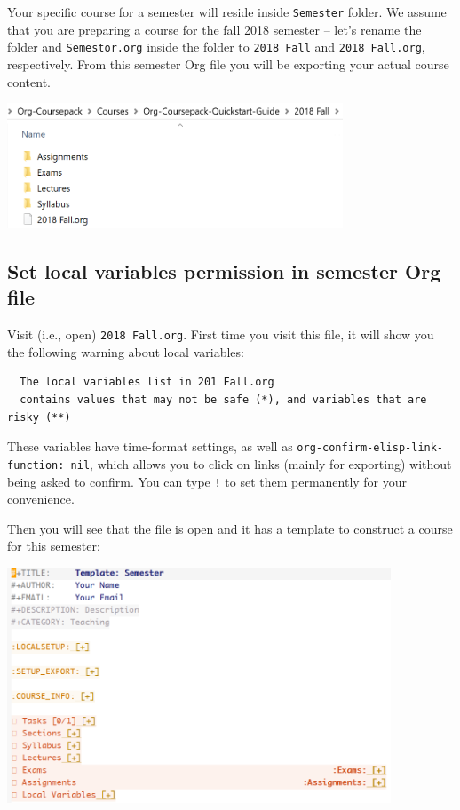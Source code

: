 \documentclass[10pt,article]{article}
\begin{document}
Your specific course for a semester will reside inside \texttt{Semester} folder. We
assume that you are preparing a course for the fall 2018 semester -- let's
rename the folder and \texttt{Semestor.org} inside the folder to \texttt{2018 Fall} and
\texttt{2018 Fall.org}, respectively. From this semester Org file you will be
exporting your actual course content.

\begin{center}
\includegraphics[width=10cm]{../../../Assets/Images/Org-Teaching/Quickstart_Semester-renamed.png}
\end{center}
\subsection{Set local variables permission in semester Org file}
\label{sec:orgc210200}
Visit (i.e., open) \texttt{2018 Fall.org}. First time you visit this file, it will 
show you the following warning about local variables:

\begin{verbatim}
  The local variables list in 201 Fall.org
  contains values that may not be safe (*), and variables that are risky (**)
\end{verbatim}

These variables have time-format settings, as well as
\texttt{org-confirm-elisp-link-function: nil}, which allows you to click on links
(mainly for exporting) without being asked to confirm. You can type \texttt{!} to set
them permanently for your convenience.

Then you will see that the file is open and it has a template to construct a
course for this semester:

\begin{center}
\includegraphics[height=7cm]{../../../Assets/Images/Org-Teaching/Quickstart_Semester-Org-File.png}
\end{center}
\end{document}
